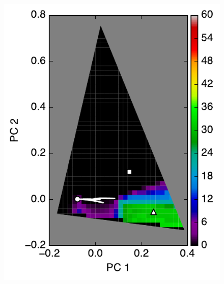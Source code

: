 \documentclass[iop,numberedappendix,apj]{emulateapj}
\begin{document}
\begin{figure}[tbh!]
\begin{minipage}{0.33\hsize}
\begin{center}
	\includegraphics[width=\hsize]{mockdata_90deg_3types_t360_lc_noreg_1.pdf}
    \end{center}	
   \end{minipage}
   \begin{minipage}{0.33\hsize}
    \begin{center}

\end{center}
\end{minipage}
\end{figure}
\end{document}
